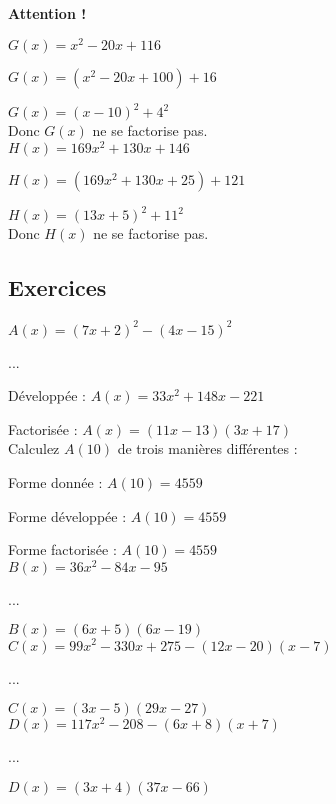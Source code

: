 \textbf{Attention !}

$ G(x) = x^2 - 20x + 116 $

$ G(x) = \left(x^2-20x + 100\right) + 16 $

$ G(x) = \left(x-10\right)^2 + 4^2 $ \\

Donc $ G(x) $ ne se factorise pas. \\

$ H(x) = 169x^2+130x+146 $

$ H(x) = \left(169x^2+130x+25\right)+121 $

$ H(x) = \left(13x+5\right)^2 + 11^2 $ \\

Donc $ H(x) $ ne se factorise pas. \\

\newpage

\subsection{Exercices}

$ A(x) = \left(7x+2\right)^2-\left(4x-15\right)^2 $

...

Développée : $ A(x) = 33x^2 + 148x - 221 $

Factorisée : $ A(x) = \left(11x-13\right)\left(3x+17\right) $ \\

Calculez $ A(10) $ de trois manières différentes :

Forme donnée : $ A(10) = 4559 $

Forme développée : $ A(10) = 4559 $

Forme factorisée : $ A(10) = 4559 $ \\

$ B(x) = 36x^2-84x-95 $

...

$ B(x) = \left(6x+5\right)\left(6x-19\right) $ \\

$ C(x) = 99x^2 - 330x + 275 - \left(12x-20\right)\left(x-7\right) $

...

$ C(x) = \left(3x-5\right)\left(29x-27\right) $ \\

$ D(x) = 117x^2 - 208 - \left(6x+8\right)\left(x+7\right)$ 

...

$ D(x) = \left(3x+4\right)\left(37x-66\right) $


\ifdefined\COMPLETE
\else
    
\fi